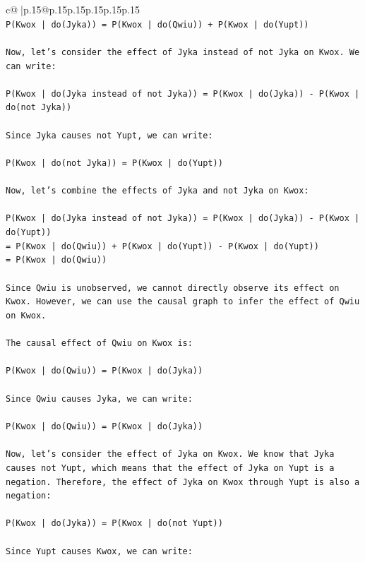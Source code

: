 \documentclass{article}
\begin{document}
{\begin{supertabular}{c@{$\;$}|p{.15\linewidth}@{}p{.15\linewidth}p{.15\linewidth}p{.15\linewidth}p{.15\linewidth}p{.15\linewidth}}
{{{\\ 
\texttt{P(Kwox | do(Jyka)) = P(Kwox | do(Qwiu)) + P(Kwox | do(Yupt))} \\
\\ 
\texttt{Now, let's consider the effect of Jyka instead of not Jyka on Kwox. We can write:} \\
\\ 
\texttt{P(Kwox | do(Jyka instead of not Jyka)) = P(Kwox | do(Jyka)) {-} P(Kwox | do(not Jyka))} \\
\\ 
\texttt{Since Jyka causes not Yupt, we can write:} \\
\\ 
\texttt{P(Kwox | do(not Jyka)) = P(Kwox | do(Yupt))} \\
\\ 
\texttt{Now, let's combine the effects of Jyka and not Jyka on Kwox:} \\
\\ 
\texttt{P(Kwox | do(Jyka instead of not Jyka)) = P(Kwox | do(Jyka)) {-} P(Kwox | do(Yupt))} \\
\texttt{= P(Kwox | do(Qwiu)) + P(Kwox | do(Yupt)) {-} P(Kwox | do(Yupt))} \\
\texttt{= P(Kwox | do(Qwiu))} \\
\\ 
\texttt{Since Qwiu is unobserved, we cannot directly observe its effect on Kwox. However, we can use the causal graph to infer the effect of Qwiu on Kwox.} \\
\\ 
\texttt{The causal effect of Qwiu on Kwox is:} \\
\\ 
\texttt{P(Kwox | do(Qwiu)) = P(Kwox | do(Jyka))} \\
\\ 
\texttt{Since Qwiu causes Jyka, we can write:} \\
\\ 
\texttt{P(Kwox | do(Qwiu)) = P(Kwox | do(Jyka))} \\
\\ 
\texttt{Now, let's consider the effect of Jyka on Kwox. We know that Jyka causes not Yupt, which means that the effect of Jyka on Yupt is a negation. Therefore, the effect of Jyka on Kwox through Yupt is also a negation:} \\
\\ 
\texttt{P(Kwox | do(Jyka)) = P(Kwox | do(not Yupt))} \\
\\ 
\texttt{Since Yupt causes Kwox, we can write:} \\
}}}
\end{supertabular}}
\end{document}
